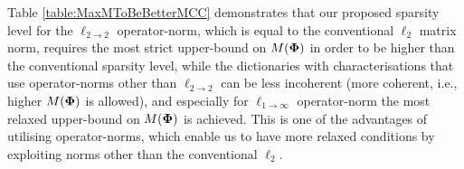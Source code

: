 \begin{remark}
\label{Rmrk:DontKnow2}
Table \ref{table:MaxMToBeBetterMCC} demonstrates that our proposed sparsity level for the $\ell_{2 {\to} 2}$ operator-norm, which is equal to the conventional $\ell_{2}$ matrix norm, requires the most strict upper-bound on $M(\boldsymbol{\Phi})$ in order to be higher than the conventional sparsity level, while the dictionaries with characterisations that use operator-norms other than $\ell_{2 {\to} 2}$ can be less incoherent (more coherent, i.e., higher $M(\boldsymbol{\Phi})$ is allowed), and especially for $\ell_{1 {\to} \infty}$ operator-norm the most relaxed upper-bound on $M(\boldsymbol{\Phi})$ is achieved.
This is one of the advantages of utilising operator-norms, which enable us to have more relaxed conditions by exploiting norms other than the conventional $\ell_{2}$.
\end{remark}